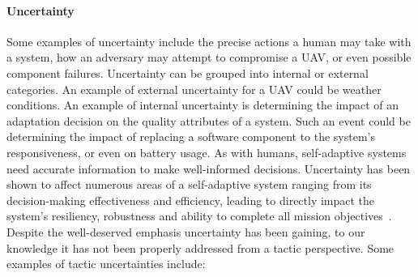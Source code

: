 \documentclass{article}
\begin{document}
\paragraph{Uncertainty}Some examples of uncertainty include the precise actions a human may take with a system, how an adversary may attempt to compromise a UAV, or even possible component failures. Uncertainty can be grouped into internal or external categories. An example of external uncertainty for a UAV could be weather conditions. An example of internal uncertainty is determining the impact of an adaptation decision on the quality attributes of a system. Such an event could be determining the impact of replacing a software component to the system's responsiveness, or even on battery usage. As with humans, self-adaptive systems need accurate information to make well-informed decisions. Uncertainty has been shown to affect numerous areas of a self-adaptive system ranging from its decision-making effectiveness and efficiency, leading to directly impact the system's resiliency, robustness and ability to complete all mission objectives~\cite{mahdavi2016classification, camara2017uncertainty}. Despite the well-deserved emphasis uncertainty has been gaining, to our knowledge it has not been properly addressed from a tactic perspective. Some examples of tactic uncertainties include:


\end{document}

